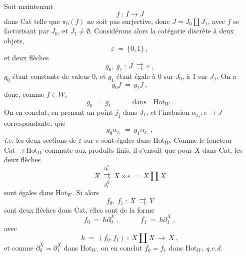\documentclass[11pt]{article}
\newcommand{\msp}[1]{\marginpar{\footnotesize [#1]}}
\newcommand{\Hot}{\mathrm{Hot}}
\newcommand{\Cat}{\mathrm{Cat}}
\begin{document}
Soit maintenant
\[
f\ :\ I\longrightarrow J
\]
dans Cat telle que $\pi_0(f)$ ne soit pas surjective, donc $J=J_0\amalg J_1$, avec $f$ se factorisant par $J_0$, et $J_1\neq\emptyset$. Considérons alors la catégorie discrète à deux objets,
\[
\varepsilon\ =\ \{0,1\}\ ,
\]
et deux flèches
\[
g_0,\ g_1\ :\ J\ \rightrightarrows\ \varepsilon\ ,
\]
$g_0$ étant constante de valeur 0, et $g_1$ étant égale à 0 sur $J_0$, à 1 sur $J_1$. On a
\[
g_0f\ =\ g_1f\ ,
\]
donc, comme $f\in W$,
\[
g_0\ =\ g_1\qquad\quad\text{dans}\quad\Hot_W\ .
\]
On en conclut, en prenant un point $j_1$ dans $J_1$, et l'inclusion $\alpha_{j_1}:e\longrightarrow J$ correspondante, que
\msp{page 133 quinquies}
\[
g_0\alpha_{j_1}\ =\ g_1\alpha_{j_1}\ ,
\]
\textit{i.e.} les deux sections de $\varepsilon$ sur $e$ sont égales dans $\Hot_W$. Comme le foncteur $\Cat\longrightarrow\Hot_W$ commute aux produits finis, il s'ensuit que pour $X$ dans Cat, les deux flèches
\[
X\ \underset{\partial_1^X}{\overset{\partial_0^X}{\rightrightarrows}}\ X\times\varepsilon\ =\ X\amalg X
\]
sont égales dans $\Hot_W$. Si alors
\[
f_0,\ f_1\ :\ X\ \rightrightarrows\ Y
\]
sont deux flèches dans Cat, elles sont de la forme
\[
f_0\ =\ h\partial_0^X\ ,\qquad\quad f_1\ =\ h\partial_1^X\ ,
\]
avec
\[
h\ =\ (f_0,f_1)\ :\ X\amalg X\ \longrightarrow\ X\ , %
\]
et comme $\partial_0^X=\partial_1^X$ dans $\Hot_W$, on en conclut $f_0=f_1$ dans $\Hot_W$, \quad \textit{q.e.d.}
\end{document}
